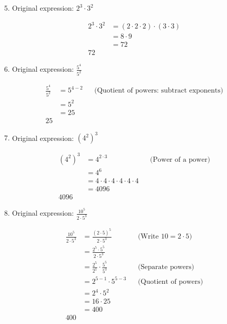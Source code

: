 \documentclass{article}
\begin{document}
\begin{enumerate}
\setcounter{enumi}{4}

\item
Original expression: \quad $2^3 \cdot 3^2$

\begin{align*}
2^3 \cdot 3^2 &= (2 \cdot 2 \cdot 2) \cdot (3 \cdot 3) \\
&= 8 \cdot 9 \\
&= 72 \\
\boxed{72}
\end{align*}

\item
Original expression: \quad $\frac{5^4}{5^2}$

\begin{align*}
\frac{5^4}{5^2} &= 5^{4 - 2} && \text{(Quotient of powers: subtract exponents)} \\
&= 5^2 \\
&= 25 \\
\boxed{25}
\end{align*}

\item
Original expression: \quad $(4^2)^3$

\begin{align*}
(4^2)^3 &= 4^{2 \cdot 3} && \text{(Power of a power)} \\
&= 4^6 \\
&= 4 \cdot 4 \cdot 4 \cdot 4 \cdot 4 \cdot 4 \\
&= 4096 \\
\boxed{4096}
\end{align*}

\item
Original expression: \quad $\frac{10^5}{2 \cdot 5^3}$

\begin{align*}
\frac{10^5}{2 \cdot 5^3} &= \frac{(2 \cdot 5)^5}{2 \cdot 5^3} && \text{(Write }10=2 \cdot 5) \\
&= \frac{2^5 \cdot 5^5}{2 \cdot 5^3} \\
&= \frac{2^5}{2^1} \cdot \frac{5^5}{5^3} && \text{(Separate powers)} \\
&= 2^{5-1} \cdot 5^{5-3} && \text{(Quotient of powers)} \\
&= 2^4 \cdot 5^2 \\
&= 16 \cdot 25 \\
&= 400 \\
\boxed{400}
\end{align*}
\end{enumerate}
\end{document}
